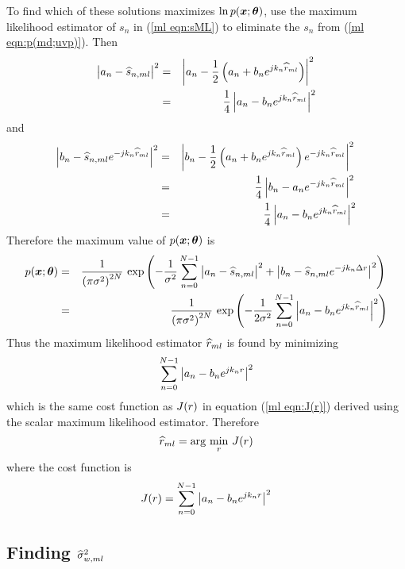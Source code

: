 To find which of these solutions maximizes $\ln p(\bm{x};\bm{\theta})$, use the
maximum likelihood estimator of $s_n$ in (\ref{ml eqn:sML}) to eliminate the
$s_n$ from (\ref{ml eqn:p(md;uvp)}).  Then
\begin{eqnarray}
\left|\vphantom{\e{k}}a_n-\sML{n}\right|^2
&=&\left|\vphantom{\e{k}}a_n-\frac{1}{2}
	\left(a_n+b_n\e{jk_n\rML}\right)\right|^2\nn\\
&=&\frac{1}{4}\left|a_n-b_n\e{jk_n\rML}\right|^2
\end{eqnarray}
and
\begin{eqnarray}
\left|b_n-\widehat{s}_{n,ml}{e^{-jk_n\widehat{r}_{ml}}}\right|^2
&=&\left|b_n-\frac{1}{2}\left(a_n+b_n{e^{jk_n\widehat{r}_{ml}}}\right)
	{e^{-jk_n\widehat{r}_{ml}}}\right|^2{\nonumber}\\
&=&\frac{1}{4}\left|b_n-a_n{e^{-jk_n\widehat{r}_{ml}}}\right|^2{\nonumber}\\
&=&\frac{1}{4}\left|a_n-b_n{e^{jk_n\widehat{r}_{ml}}}\right|^2
\end{eqnarray}
Therefore the maximum value of $p(\bm{x};\bm{\theta})$ is
\begin{eqnarray}
p(\md;\uvp)
&=&\frac{1}{\left(\pi\nv\right)^{2N}}\,\exp\left(
-\frac{1}{\nv}\sum_{n=0}^{N-1}
\left|\vphantom{\e{k}}a_n-\sML{n}\right|^2+\left|b_n-\sML{n}\e{-jk_n\dr}\right|^2
\right)\nn\\
&=&\frac{1}{\left(\pi\nv\right)^{2N}}\,\exp\left(
-\frac{1}{2\nv}\sum_{n=0}^{N-1}
\left|a_n-b_n\e{jk_n\rML}\right|^2\right)
\end{eqnarray}
Thus the maximum likelihood estimator $\widehat{r}_{ml}$ is found by minimizing 
\begin{equation}
\sum_{n=0}^{N-1} \left|a_n-b_n{e^{jk_n{r}}}\right|^2
\end{equation}
which is the same cost function as $J({r})$ in equation (\ref{ml eqn:J(r)})
derived using the scalar maximum likelihood estimator.
Therefore
\begin{equation}\label{ml eqn:J(r) uvp}
\widehat{r}_{ml}=\arg\,\min_{{r}}\,J({r})
\end{equation}
where the cost function is
\begin{equation}
J({r})=\sum_{n=0}^{N-1} \left|a_n-b_n{e^{jk_n{r}}}\right|^2
\end{equation}

\subsection{Finding $\widehat{\sigma}^2_{{w},ml}$}

